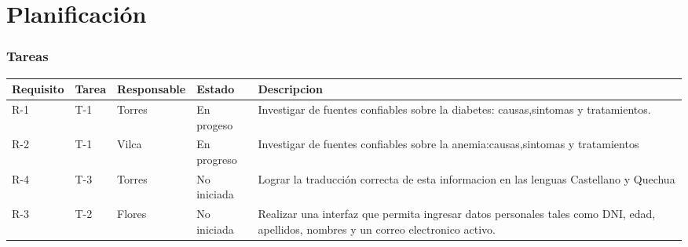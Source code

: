\chapter{Planificación}

\subsection{Tareas}
\begin{table}[htbp]
	\begin{center}
		\begin{tabular}{| p{1.8cm}| p{1.2cm}| p{2.4cm}|p{2.2cm} |p{7.8cm} |}
	\hline
	\textbf{Requisito} & \textbf{Tarea} & \textbf {Responsable}& \textbf{Estado} & \textbf{Descripcion}
	\\\hline  
	R-1&T-1&Torres&En progeso&Investigar de fuentes confiables sobre la diabetes: causas,sintomas y tratamientos.
	 \\ \hline
	R-2&T-1&Vilca&En progreso&Investigar de fuentes confiables sobre la anemia:causas,sintomas y tratamientos
	 \\ \hline
	R-4&T-3&Torres&No iniciada&Lograr la traducción correcta de esta informacion en las lenguas Castellano y Quechua
	 \\ \hline
	R-3&T-2&Flores&No iniciada&Realizar una interfaz que permita ingresar datos personales tales como DNI, edad, apellidos, nombres y un correo electronico activo.
	 \\ \hline
		\end{tabular}
\end{center}
\end{table}

